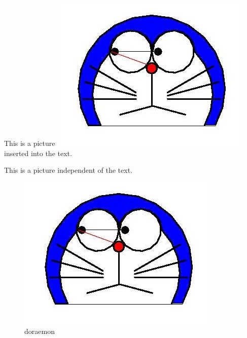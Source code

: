 \documentclass{article}
\begin{document}
\setlength{\fboxsep}{.5cm}

This is a picture \includegraphics{doraemon1.jpg} inserted into the text.

This is a picture independent of the text.
\begin{figure}[htbp]
    \centering
    \includegraphics{doraemon1.jpg}
    \caption{doraemon}
\end{figure}
\end{document}
